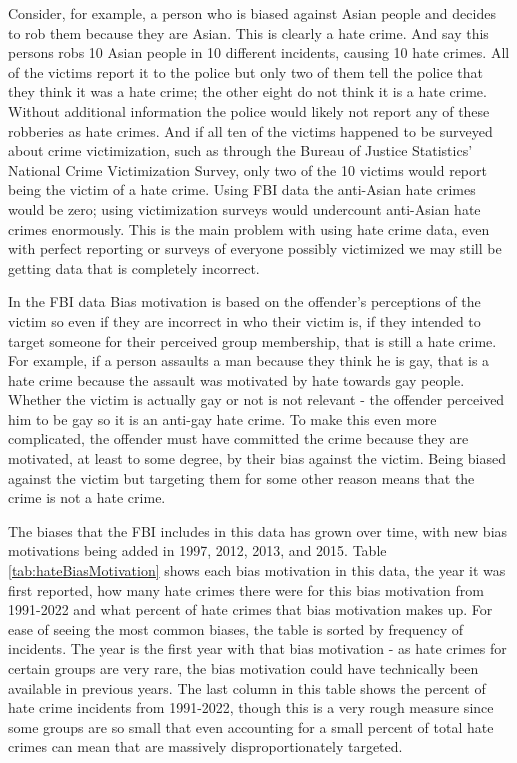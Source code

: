 \documentclass[
  12pt,
  openany]{book}
\begin{document}
Consider, for example, a person who is biased against Asian people and decides to rob them because they are Asian. This is clearly a hate crime. And say this persons robs 10 Asian people in 10 different incidents, causing 10 hate crimes. All of the victims report it to the police but only two of them tell the police that they think it was a hate crime; the other eight do not think it is a hate crime. Without additional information the police would likely not report any of these robberies as hate crimes. And if all ten of the victims happened to be surveyed about crime victimization, such as through the Bureau of Justice Statistics' National Crime Victimization Survey, only two of the 10 victims would report being the victim of a hate crime. Using FBI data the anti-Asian hate crimes would be zero; using victimization surveys would undercount anti-Asian hate crimes enormously. This is the main problem with using hate crime data, even with perfect reporting or surveys of everyone possibly victimized we may still be getting data that is completely incorrect.

In the FBI data Bias motivation is based on the offender's perceptions of the victim so even if they are incorrect in who their victim is, if they intended to target someone for their perceived group membership, that is still a hate crime. For example, if a person assaults a man because they think he is gay, that is a hate crime because the assault was motivated by hate towards gay people. Whether the victim is actually gay or not is not relevant - the offender perceived him to be gay so it is an anti-gay hate crime. To make this even more complicated, the offender must have committed the crime because they are motivated, at least to some degree, by their bias against the victim. Being biased against the victim but targeting them for some other reason means that the crime is not a hate crime.

The biases that the FBI includes in this data has grown over time, with new bias motivations being added in 1997, 2012, 2013, and 2015. Table \ref{tab:hateBiasMotivation} shows each bias motivation in this data, the year it was first reported, how many hate crimes there were for this bias motivation from 1991-2022 and what percent of hate crimes that bias motivation makes up. For ease of seeing the most common biases, the table is sorted by frequency of incidents. The year is the first year with that bias motivation - as hate crimes for certain groups are very rare, the bias motivation could have technically been available in previous years. The last column in this table shows the percent of hate crime incidents from 1991-2022, though this is a very rough measure since some groups are so small that even accounting for a small percent of total hate crimes can mean that are massively disproportionately targeted.
\end{document}

